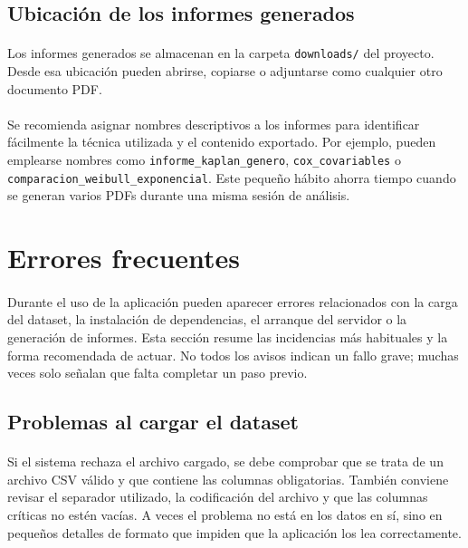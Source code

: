 \subsection{Ubicación de los informes generados}

\paragraph*{}Los informes generados se almacenan en la carpeta \texttt{downloads/} del proyecto. Desde esa ubicación pueden abrirse, copiarse o adjuntarse como cualquier otro documento PDF.

\paragraph*{}Se recomienda asignar nombres descriptivos a los informes para identificar fácilmente la técnica utilizada y el contenido exportado. Por ejemplo, pueden emplearse nombres como \texttt{informe\_kaplan\_genero}, \texttt{cox\_covariables} o \texttt{comparacion\_weibull\_exponencial}. Este pequeño hábito ahorra tiempo cuando se generan varios PDFs durante una misma sesión de análisis.

\section{Errores frecuentes}

\paragraph*{}Durante el uso de la aplicación pueden aparecer errores relacionados con la carga del dataset, la instalación de dependencias, el arranque del servidor o la generación de informes. Esta sección resume las incidencias más habituales y la forma recomendada de actuar. No todos los avisos indican un fallo grave; muchas veces solo señalan que falta completar un paso previo.

\subsection{Problemas al cargar el dataset}

\paragraph*{}Si el sistema rechaza el archivo cargado, se debe comprobar que se trata de un archivo CSV válido y que contiene las columnas obligatorias. También conviene revisar el separador utilizado, la codificación del archivo y que las columnas críticas no estén vacías. A veces el problema no está en los datos en sí, sino en pequeños detalles de formato que impiden que la aplicación los lea correctamente.


